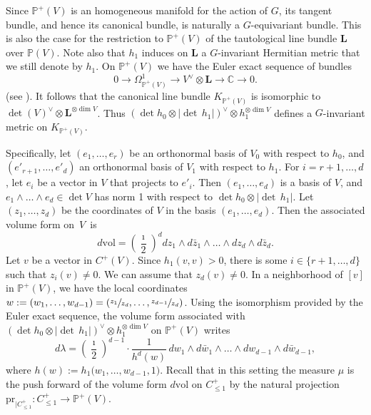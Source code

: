 \documentclass[JEP,XML,SOM,Unicode]{cedram}
\theoremstyle{plain}
\theoremstyle{definition}
\def\C{\mathbb{C}}
\newcommand{\Pb}{\mathbb{P}}
\newcommand{\Lb}{\mathbf{L}}
\newcommand{\vol}{\mathrm{vol}}
\newcommand{\pr}{\mathrm{pr}}
\begin{document}
Since $\Pb^+(V)$ is an homogeneous manifold for the action of $G$, its tangent bundle, and hence its canonical bundle, is naturally a $G$-equivariant bundle. This is also the case for the restriction to $\Pb^+(V)$ of the tautological line bundle $\Lb$ over $\Pb(V)$.
Note also that $h_1$ induces on $\Lb$ a $G$-invariant Hermitian metric that we still denote by $h_1$.
On $\Pb^+(V)$ we have the Euler exact sequence of bundles
\[
0\to \Omega^1_{\Pb^+(V)}\to V^\vee\otimes \Lb\to \C \to 0.
\]
(see \cite[Th.\,II.8.13]{Hart}). It follows that the canonical line bundle $K_{\Pb^+(V)}$ is isomorphic to $\det(V)^\vee\otimes \Lb^{\otimes\dim V}$. Thus $(\det h_0 \otimes |{\det\,} h_1| )^\vee \otimes h_1^{\otimes \dim V }$ defines a $G$-invariant metric on $K_{\Pb^+(V)}$.

Specifically, let $(e_1,\dots,e_r)$ be an orthonormal basis of $V_0$ with respect to $h_0$, and $(e'_{r+1},\dots,e'_d)$ an orthonormal basis of $V_1$ with respect to $h_1$. For $i=r+1,\dots,d$, let $e_i$ be a vector in $V$ that projects to $e'_i$.
Then $(e_1,\dots,e_d)$ is a basis of $V$, and $e_1\wedge\dots\wedge e_d \in \det V$ has norm 1 with respect to $\det h_0 \otimes |{\det\,} h_1|$.
Let $(z_1,\dots,z_d)$ be the coordinates of $V$ in the basis $(e_1,\dots,e_d)$.
Then the associated volume form on~$V$~is
\[
d\vol=\left(\frac{\imath}{2}\right)^{d} dz_1\wedge d\bar{z}_1\wedge\dots\wedge dz_{d}\wedge d\bar{z}_{d}.
\]
Let $v$ be a vector in $C^+(V)$. Since $h_1(v,v)>0$, there is some $i\in \{r+1,\dots,d\}$ such that $z_i(v)\not=0$.
We can assume that $z_d(v)\neq 0$.
In a neighborhood of $[v]$ in $\Pb^+(V)$, we have the local coordinates $w:=(w_1,\dots,w_{d-1})=(\sfrac{z_1}{z_d},\dots,\sfrac{z_{d-1}}{z_d})$. Using the isomorphism provided by the Euler exact sequence, the volume form associated with $(\det h_0 \otimes |{\det\,} h_1| )^\vee \otimes h_1^{\otimes \dim V}$ on $\Pb^+(V)$ writes
\[
d\lambda= \left(\frac{\imath}{2}\right)^{d-1}\cdot\frac{1}{h^d(w)}\, dw_1\wedge d\bar{w}_1\wedge \dots \wedge dw_{d-1}\wedge d\bar{w}_{d-1},
\]
where $h(w):=h_1\bigl(w_1,\dots,w_{d-1},1\bigr)$.
Recall that in this setting the measure $\mu$ is the push forward of the volume form $d\vol$ on $C^+_{\leq 1}$ by the natural projection $\pr_{|C^+_{\leq 1}}: C^+_{\leq 1} \to \Pb^+(V)$.
\end{document}
